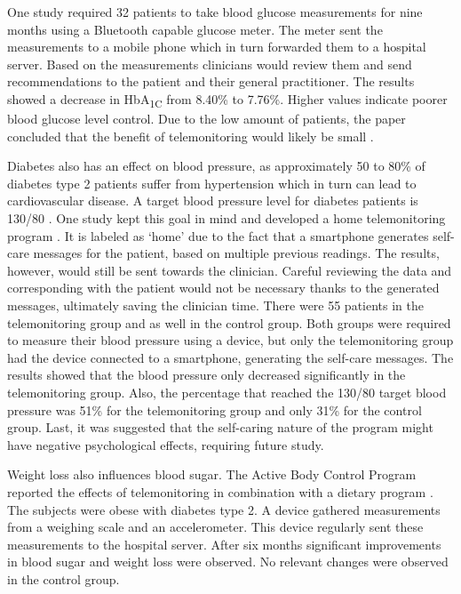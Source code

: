        One study required 32 patients to take blood glucose measurements for nine months using a Bluetooth capable glucose meter. The meter sent the measurements to a mobile phone which in turn forwarded them to a hospital server. Based on the measurements clinicians would review them and send recommendations to the patient and their general practitioner. The results showed a decrease in HbA\textsubscript{1C} from 8.40\% to 7.76\%. Higher values indicate poorer blood glucose level control. Due to the low amount of patients, the paper concluded that the benefit of telemonitoring would likely be small \cite{istepanian2009evaluation}.

        Diabetes also has an effect on blood pressure, as approximately 50 to 80\% of diabetes type 2 patients suffer from hypertension which in turn can lead to cardiovascular disease. A target blood pressure level for diabetes patients is 130/80 \cite{landsberg2004diabetes}. One study kept this goal in mind and developed a home telemonitoring program \cite{logan2012effect}. It is labeled as `home' due to the fact that a smartphone generates self-care messages for the patient, based on multiple previous readings. The results, however, would still be sent towards the clinician. Careful reviewing the data and corresponding with the patient would not be necessary thanks to the generated messages, ultimately saving the clinician time. There were 55 patients in the telemonitoring group and as well in the control group. Both groups were required to measure their blood pressure using a device, but only the telemonitoring group had the device connected to a smartphone, generating the self-care messages. The results showed that the blood pressure only decreased significantly in the telemonitoring group. Also, the percentage that reached the 130/80 target blood pressure was 51\% for the telemonitoring group and only 31\% for the control group. Last, it was suggested that the self-caring nature of the program might have negative psychological effects, requiring future study.

        Weight loss also influences blood sugar. The Active Body Control Program reported the effects of telemonitoring in combination with a dietary program \cite{luley2011weight}. The subjects were obese with diabetes type 2. A device gathered measurements from a weighing scale and an accelerometer. This device regularly sent these measurements to the hospital server. After six months significant improvements in blood sugar and weight loss were observed. No relevant changes were observed in the control group.

